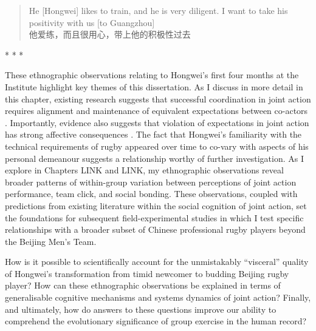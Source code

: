 \begin{CJK}{UTF8}{gbsn}
  \begin{quotation}
He [Hongwei] likes to train, and he is very diligent. I want to take his positivity with us [to Guangzhou] \\
他爱练，而且很用心，带上他的积极性过去
  \end{quotation}


                          \begin{center}
                            * * *
                          \end{center}


These ethnographic observations relating to Hongwei's first four months at the Institute highlight key themes of this dissertation.  As I discuss in more detail in this chapter, existing research suggests that successful coordination in joint action requires alignment and maintenance of equivalent expectations between co-actors \citep{Sebanz2006,Vesper2017,Pesquita2017}.  Importantly, evidence also suggests that violation of expectations in joint action has strong affective consequences \citep{Chetverikov2016}.  The fact that Hongwei's familiarity with the technical requirements of rugby appeared over time to co-vary with aspects of his personal demeanour suggests a relationship worthy of further investigation.  As I explore in Chapters LINK and LINK, my ethnographic observations reveal broader patterns of within-group variation between perceptions of joint action performance, team click, and social bonding.  These observations, coupled with predictions from existing literature within the social cognition of joint action, set the foundations for subsequent field-experimental studies in which I test specific relationships with a broader subset of Chinese professional rugby players beyond the Beijing Men's Team.

How is it possible to scientifically account for the unmistakably ``visceral'' quality of Hongwei's transformation from timid newcomer to budding Beijing rugby player?  How can these ethnographic observations be explained in terms of generalisable cognitive mechanisms and systems dynamics of joint action?  Finally, and ultimately, how do answers to these questions improve our ability to comprehend the evolutionary significance of group exercise in the human record?













\end{CJK}
